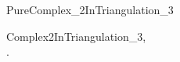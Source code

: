 \begin{ccRefConcept}{PureComplex_2InTriangulation_3}
\ccHasModels



\ccSeeAlso

{Complex2InTriangulation\_3}, \\
.





\end{ccRefConcept}


